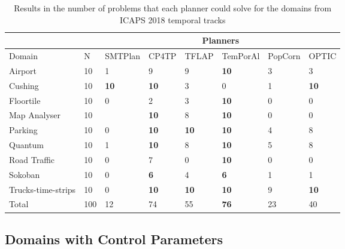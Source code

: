 \begin{table}[thb]
\centering
\begin{tabular}{|l|l|l|l|l|l|l|l|}

\hline
                   &     & \multicolumn{6}{c|}{Planners}                                                 \\ \hline
Domain             & N   & SMTPlan     & CP4TP       & TFLAP       & TemPorAl    & PopCorn & OPTIC       \\ \hline
Airport            & 10  & 1           & 9           & 9           & \textbf{10} & 3       & 3           \\ \hline
Cushing            & 10  & \textbf{10} & \textbf{10} & 3           & 0           & 1       & \textbf{10} \\ \hline
Floortile          & 10  & 0           & 2           & 3           & \textbf{10} & 0       & 0           \\ \hline
Map Analyser       & 10  &             & \textbf{10} & 8           & \textbf{10} & 0       & 0           \\ \hline
Parking            & 10  & 0           & \textbf{10} & \textbf{10} & \textbf{10} & 4       & 8           \\ \hline
Quantum            & 10  & 1           & \textbf{10} & 8           & \textbf{10} & 5       & 8           \\ \hline
Road Traffic       & 10  & 0           & 7           & 0           & \textbf{10} & 0       & 0           \\ \hline
Sokoban            & 10  & 0           & \textbf{6}  & 4           & \textbf{6}  & 1       & 1           \\ \hline
Trucks-time-strips & 10  & 0           & \textbf{10} & \textbf{10} & \textbf{10} & 9       & \textbf{10} \\ \hline
Total              & 100 & 12          & 74          & 55          & \textbf{76} & 23      & 40          \\ \hline
\end{tabular}
\caption{Results in the number of problems that each planner could solve for the domains from ICAPS 2018 temporal tracks}
\label{tab:ipc result}
\end{table}

\subsection{Domains with Control Parameters}\label{sec:eval_cp}

